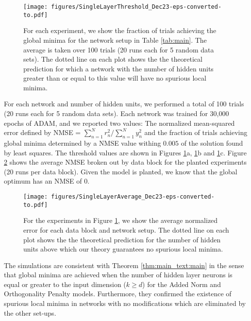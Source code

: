 \documentclass[11pt]{article}
\theoremstyle{plain}
\theoremstyle{plain}
\numberwithin{equation}{section}
\numberwithin{lemma}{section}
\numberwithin{theorem}{section}
\numberwithin{corollary}{section}
\numberwithin{observation}{section}
\numberwithin{definition}{section}
\numberwithin{example}{section}
\begin{document}
\begin{figure}
\begin{center}
\noindent
 \texttt{[image: figures/SingleLayerThreshold\_Dec23-eps-converted-to.pdf]}
\caption{For each experiment, we show the fraction of trials achieving the global minima for the network setup in Table \ref{tab:main}.  The average is taken over 100 trials (20 runs each for 5 random data sets). The dotted line on each plot shows the the theoretical prediction for which a network with the number of hidden units greater than or equal to this value will have no spurious local minima.}
\label{fig:scalar_threshold}
\end{center}
\end{figure}









For each network and number of hidden units, we performed a total of 100 trials (20 runs each for 5 random data sets).  Each network was trained for 30,000 epochs of ADAM, and we reported two values: The normalized mean-squared error defined by NMSE = $\sum_{n=1}^N r_n^2 / \sum_{n=1}^N y_n^2$ and the fraction of trials achieving global minima determined by a NMSE value withing $0.005$ of the solution found by least squares. The threshold values are shown in Figures \ref{fig:scalar_threshold}a, \ref{fig:scalar_threshold}b and \ref{fig:scalar_threshold}c.  Figure \ref{fig:scalar_average} shows the average NMSE broken out by data block for the planted experiments (20 runs per data block).  Given the model is planted, we know that the global optimum has an NMSE of 0.




\begin{figure}
\begin{center}
\noindent
\texttt{[image: figures/SingleLayerAverage\_Dec23-eps-converted-to.pdf]}
\caption{For the experiments in Figure \ref{fig:scalar_threshold}, we show the average normalized error for each data block and network setup.  The dotted line on each plot shows the the theoretical prediction for the number of hidden units above which our theory guarantees no spurious local minima.}
\label{fig:scalar_average}
\end{center}
\end{figure}

The simulations are consistent with Theorem \ref{thm:main_text:main} in the sense that global minima are achieved when the number of hidden layer neurons is equal or greater to the input dimension ($k \geq d$) for the Added Norm and Orthogonality Penalty models.  Furthermore, they confirmed the existence of spurious local minima in networks with no modifications which are eliminated by the other set-ups.
\end{document}
